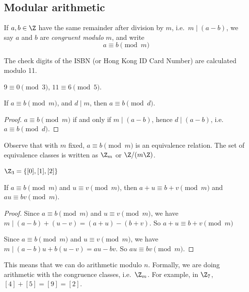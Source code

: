 \documentclass[a4paper]{article}
\begin{document}
\subsection{Modular arithmetic}
\begin{defi}[Modulo]
  If $a, b\in \Z$ have the same remainder after division by $m$, i.e.\ $m \mid (a - b)$, we say $a$ and $b$ are \emph{congruent modulo} $m$, and write
  \[
    a\equiv b\pmod m
  \]
\end{defi}

\begin{eg}
  The check digits of the ISBN (or Hong Kong ID Card Number) are calculated modulo 11.
\end{eg}

\begin{eg}
  $9 \equiv 0\pmod 3$, $11\equiv 6\pmod 5$.
\end{eg}

\begin{prop}
  If $a\equiv b\pmod m$, and $d \mid m$, then $a \equiv b\pmod d$.
\end{prop}

\begin{proof}
  $a\equiv b\pmod m$ if and only if $m \mid (a - b)$, hence $d \mid (a - b)$, i.e.\ $a \equiv b\pmod d$.
\end{proof}

Observe that with $m$ fixed, $a\equiv b\pmod m$ is an equivalence relation. The set of equivalence classes is written as $\Z_m$ or $\Z/(m\Z)$.

\begin{eg}
  $\Z_3 = \{[0], [1], [2]\}$
\end{eg}

\begin{prop}
  If $a\equiv b\pmod m$ and $u\equiv v \pmod m$, then $a + u\equiv b + v\pmod m$ and $au \equiv bv \pmod m$.
\end{prop}

\begin{proof}
  Since $a\equiv b\pmod m$ and $u\equiv v \pmod m$, we have $m \mid (a - b) + (u - v) = (a + u) - (b + v)$. So $a + u\equiv b + v\pmod m$

  Since $a\equiv b\pmod m$ and $u\equiv v \pmod m$, we have $m \mid (a - b)u + b(u - v) = au - bv$. So $au \equiv bv \pmod m$.
\end{proof}

This means that we can do arithmetic modulo $n$. Formally, we are doing arithmetic with the congruence classes, i.e.\ $\Z_m$. For example, in $\Z_7$, $[4] + [5] = [9] = [2]$.
\end{document}
